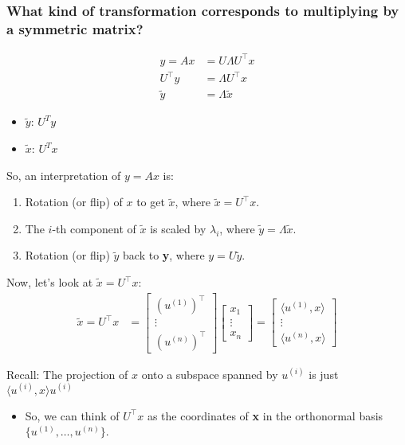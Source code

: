 \subsubsection{What kind of transformation corresponds to multiplying by a symmetric matrix?}
\begin{derivation}
    \begin{align*}
        y = A x &= U \Lambda U^\top x \\
    U^\top y &= \Lambda U^\top x \\
    \tilde{y} &= \Lambda \tilde{x}
    \end{align*}
    \begin{itemize}
        \item $\tilde{y}$: $U^T y$
        \item $\tilde{x}$: $U^T x$
    \end{itemize}
    \vspace{1em}

    So, an interpretation of \( y = A x \) is:

    \begin{enumerate}
        \item Rotation (or flip) of $x$ to get \(\tilde{x}\), where \(\tilde{x} = U^\top x\).
        \item The \(i\)-th component of \(\tilde{x}\) is scaled by \(\lambda_i\), where \(\tilde{y} = \Lambda \tilde{x}\).
        \item Rotation (or flip) \(\tilde{y}\) back to \textbf{y}, where \(y = U \tilde{y}\).
    \end{enumerate}
    \vspace{1em}


    Now, let's look at \(\tilde{x} = U^\top x\):
    \begin{align*}
    \tilde{x} = U^\top x &= 
    \begin{bmatrix}
    (u^{(1)})^\top \\
    \vdots \\
    (u^{(n)})^\top
    \end{bmatrix}
    \begin{bmatrix}
    x_1 \\
    \vdots \\
    x_n
    \end{bmatrix} =
    \begin{bmatrix}
    \langle u^{(1)}, x \rangle \\
    \vdots \\
    \langle u^{(n)}, x \rangle
    \end{bmatrix}
    \end{align*}

    Recall: The projection of $x$ onto a subspace spanned by \(u^{(i)}\) is just $\langle u^{(i)}, x \rangle u^{(i)}$
    \begin{itemize}
        \item So, we can think of \( U^\top x \) as the coordinates of \textbf{x} in the orthonormal basis \(\{ u^{(1)}, \dots, u^{(n)} \}\).
    \end{itemize}

\end{derivation}

